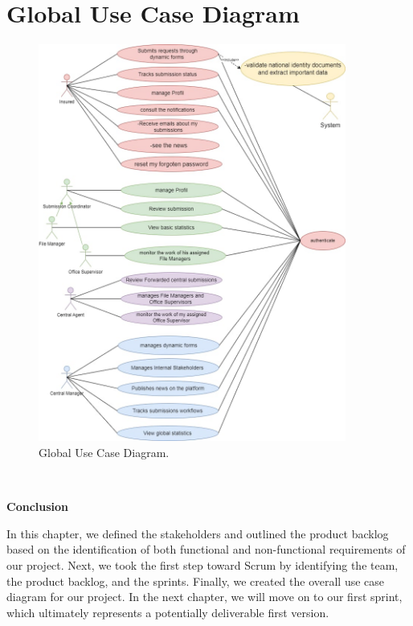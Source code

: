 \section{Global Use Case Diagram}
\begin{figure}[h]
    \centering
    \includegraphics[width=0.9\textwidth]{figures/usecaseglobal.jpg} 
    \caption{Global Use Case Diagram.}
\end{figure} \

\clearpage
\begin{center}
    \doublespacing
    \centering
    \LARGE\textbf{Conclusion} 
    \vspace{1cm} \\
    \raggedright
\end{center}
In this chapter, we defined the stakeholders and outlined the product backlog based on the identification of both functional and non-functional requirements of our project.
\vspace{0.5cm}
Next, we took the first step toward Scrum by identifying the team, the product backlog, and the sprints. Finally, we created the overall use case diagram for our project.
\vspace{0.5cm}
In the next chapter, we will move on to our first sprint, which ultimately represents a potentially deliverable first version.


